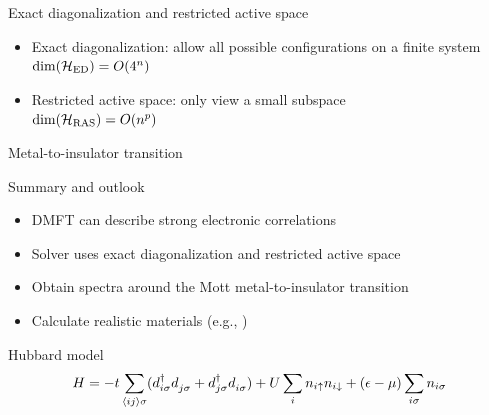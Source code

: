 \documentclass[aspectratio=169]{beamer}
\begin{document}
\begin{frame}{Exact diagonalization and restricted active space}
    \begin{center}
        
    \end{center}
    \begin{itemize}
        \item<3-> Exact diagonalization: allow all possible configurations on a finite system\\
              $\dim(\mathcal{H_\mathrm{ED}}) = O\!\left(4^n\right)$
        \item<4-> Restricted active space: only view a small subspace\\
              $\dim(\mathcal{H}_\mathrm{RAS}) = O\!\left(n^p\right)$
    \end{itemize}
\end{frame}

\begin{frame}{Metal-to-insulator transition}
    \begin{center}
        
    \end{center}
\end{frame}

\begin{frame}{Summary and outlook}
    \begin{itemize}
        \item<2-> DMFT can describe strong electronic correlations
        \item<3-> Solver uses exact diagonalization and restricted active space
        \item<4-> Obtain spectra around the Mott metal-to-insulator transition
        \item<5-> Calculate realistic materials (e.g., )
              \begin{center}
                  
              \end{center}
    \end{itemize}
\end{frame}

\appendix

\begin{frame}{Hubbard model}
    \begin{equation}
        H
        =
        -t\sum_{\langle i j\rangle\sigma}
        (d^\dag_{i\sigma} d^{\pdag}_{j\sigma} + d^\dag_{j\sigma} d^{\pdag}_{i\sigma})
        +
        U\sum_i n_{i\uparrow} n_{i\downarrow}
        +
        (\epsilon - \mu)\sum_{i\sigma} n_{i\sigma}
    \end{equation}
    \begin{center}
        
    \end{center}
\end{frame}
\end{document}
